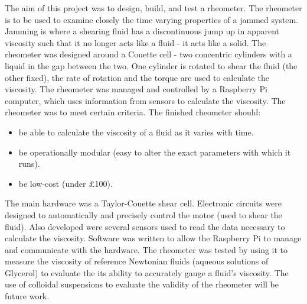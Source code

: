 \documentclass[twoside,a4]{report}
\def\br{\newline \newline \noindent}
\begin{document}
	The aim of this project was to design, build, and test a rheometer. The rheometer is to be used to examine closely the time varying properties of a jammed system. Jamming is where a shearing fluid has a discontinuous jump up in apparent viscosity such that it no longer acts like a fluid - it acts like a solid. The rheometer was designed around a Couette cell - two concentric cylinders with a liquid in the gap between the two. One cylinder is rotated to shear the fluid (the other fixed), the rate of rotation and the torque are used to calculate the viscosity. The rheometer was managed and controlled by a Raspberry Pi computer, which uses information from sensors to calculate the viscosity. The rheometer was to meet certain criteria. The finished rheometer should:
	\begin{itemize}
		\item be able to calculate the viscosity of a fluid as it varies with time.
		\item be operationally modular (easy to alter the exact parameters with which it runs).
		\item be low-cost (under \pounds 100).
	\end{itemize}
	The main hardware was a Taylor-Couette shear cell. Electronic circuits were designed to automatically and precisely control the motor (used to shear the fluid). Also developed were several sensors used to read the data necessary to calculate the viscosity. Software was written to allow the Raspberry Pi to manage and communicate with the hardware. 
	\br
	The rheometer was tested by using it to measure the viscosity of reference Newtonian fluids (aqueous solutions of Glycerol) to evaluate the its ability to accurately gauge a fluid's viscosity.  The use of colloidal suspensions to evaluate the validity of the rheometer will be future work.
	
	
	\newpage \begin{center} \large \space \normalsize \end{center}
	
\end{document}
